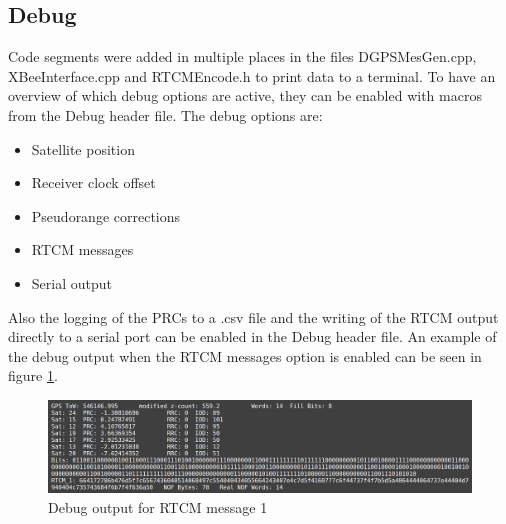 \subsection{Debug}

Code segments were added in multiple places in the files DGPSMesGen.cpp, XBeeInterface.cpp and RTCMEncode.h to print data to a terminal.
To have an overview of which debug options are active, they can be enabled with macros from the Debug header file.
The debug options are:
\begin{itemize}
 \setlength\itemsep{0.1cm}
 \item Satellite position
 \item Receiver clock offset
 \item Pseudorange corrections
 \item RTCM messages
 \item Serial output
\end{itemize}
Also the logging of the PRCs to a .csv file and the writing of the RTCM output directly to a serial port can be enabled in the Debug header file.
An example of the debug output when the RTCM messages option is enabled can be seen in figure \ref{fig:rtcm_debug}.

\begin{figure}[ht]
 \centering
 \includegraphics[width=\textwidth]{images/RTCM_Debug.png}
 \caption{Debug output for RTCM message 1}
 \label{fig:rtcm_debug}
\end{figure}
